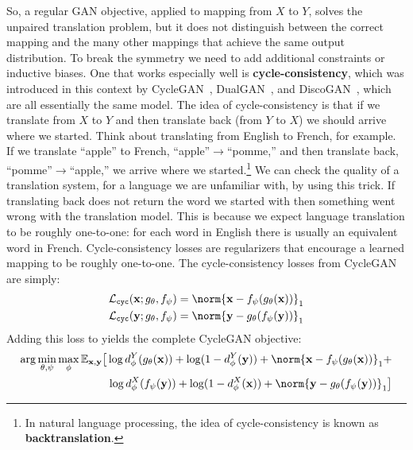 So, a regular GAN objective, applied to mapping from $X$ to $Y$, solves the unpaired translation problem, but it does not distinguish between the correct mapping and the many other mappings that achieve the same output distribution. To break the symmetry we need to add additional constraints or inductive biases. One that works especially well is \textbf{cycle-consistency}, which was introduced in this context by CycleGAN~\cite{CycleGAN2017}, DualGAN~\cite{yi2017dualgan}, and DiscoGAN~\cite{kim2017learning}, which are all essentially the same model. The idea of cycle-consistency is that if we translate from $X$ to $Y$ and then translate back (from $Y$ to $X$) we should arrive where we started. Think about translating from English to French, for example. If we translate ``apple'' to French, ``apple''$\rightarrow$``pomme,'' and then translate back, ``pomme''$\rightarrow$``apple,'' we arrive where we started.\footnote{In natural language processing, the idea of cycle-consistency is known as \textbf{backtranslation}.} We can check the quality of a translation system, for a language we are unfamiliar with, by using this trick. If translating back does not return the word we started with then something went wrong with the translation model. This is because we expect language translation to be roughly one-to-one: for each word in English there is usually an equivalent word in French. Cycle-consistency losses are regularizers that encourage a learned mapping to be roughly one-to-one. The cycle-consistency losses from CycleGAN are simply:
\begin{align}
    \mathcal{L}_{\texttt{cyc}}(\mathbf{x};g_{\theta},f_{\psi}) &= \norm{\mathbf{x} - f_{\psi}(g_{\theta}(\mathbf{x}))}_1\\
    \mathcal{L}_{\texttt{cyc}}(\mathbf{y};g_{\theta},f_{\psi}) &= \norm{\mathbf{y} - g_{\theta}(f_{\psi}(\mathbf{y}))}_1
\end{align}
Adding this loss to \eqn{\ref{eqn:conditional_generative_models:x_to_y_GAN_learning_problem}} yields the complete CycleGAN objective:
\begin{align}
    \arg\min_{\theta,\psi}\max_{\phi} \mathbb{E}_{\mathbf{x},\mathbf{y}} \big[ \log d_{\phi}^{Y}(g_{\theta}(\mathbf{x})) + \log (1 - d_{\phi}^{Y}(\mathbf{y})) + \norm{\mathbf{x} - f_{\psi}(g_{\theta}(\mathbf{x}))}_1 + \\
    \log d_{\phi}^{X}(f_{\psi}(\mathbf{y})) + \log (1 - d_{\phi}^{X}(\mathbf{x})) + \norm{\mathbf{y} - g_{\theta}(f_{\psi}(\mathbf{y}))}_1 \big]
\end{align}
